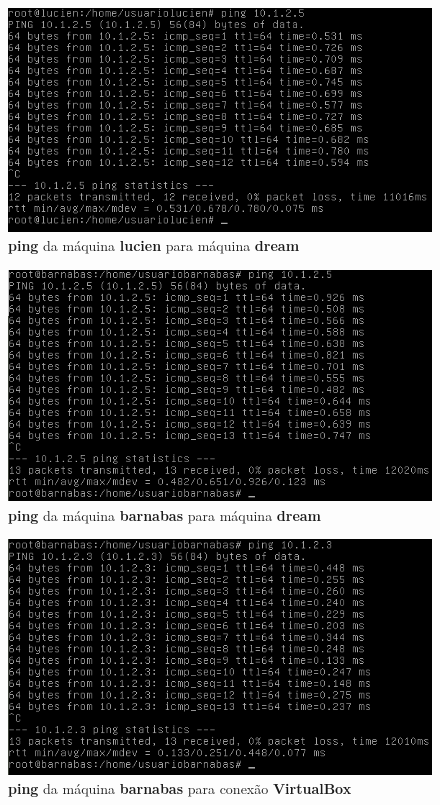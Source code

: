 \documentclass[a4paper, 12pt]{article}
\begin{document}
\begin{enumerate}
\begin{figure}[h!]
\centering
\includegraphics[width=\textwidth]{1-ping-lucien-dream.png}
\caption{{\bf ping} da máquina {\bf lucien} para máquina {\bf dream}}
\end{figure}

\begin{figure}[h!]
\centering
\includegraphics[width=\textwidth]{1-ping-barnabas-dream.png}
\caption{{\bf ping} da máquina {\bf barnabas} para máquina {\bf dream}}
\end{figure}

\begin{figure}[h!]
\centering
\includegraphics[width=\textwidth]{1-ping-barnabas-VB.png}
\caption{{\bf ping} da máquina {\bf barnabas} para conexão {\bf VirtualBox}}
\end{figure}


\end{enumerate}
\end{document}
